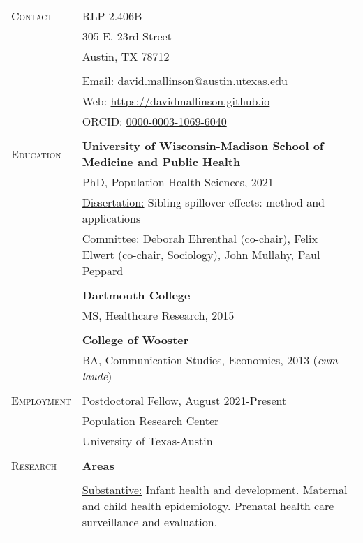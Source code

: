 \documentclass[letterpaper,10pt,oneside]{article}
\begin{document}
\begin{longtable}{@{} p{} p{}}
\textsc{Contact}   & RLP 2.406B \\
     & 305 E. 23rd Street \\
     & Austin, TX 78712 \\
     & \\
     & Email: david.mallinson@austin.utexas.edu \\
     & Web: \href{https://davidmallinson.github.io}{https://davidmallinson.github.io} \\
     & ORCID: \href{https://orcid.org/0000-0003-1069-6040/}{0000-0003-1069-6040} \\
     & \\
\textsc{Education}    & \textbf{University of Wisconsin-Madison School of Medicine and Public Health} \\
     & PhD, Population Health Sciences, 2021 \\
     & \parbox{6.15in}{\underline{Dissertation:} Sibling spillover effects: method and applications} \\
     & \parbox{6.15in}{\underline{Committee:} Deborah Ehrenthal (co-chair), Felix Elwert (co-chair, Sociology), John Mullahy, Paul Peppard} \\
     & \\
     & \textbf{Dartmouth College} \\
     & MS, Healthcare Research, 2015 \\
     & \\
     & \textbf{College of Wooster} \\
     & BA, Communication Studies, Economics, 2013 (\textit{cum laude}) \\
     & \\
\textsc{Employment} & Postdoctoral Fellow, August 2021-Present \\
     & Population Research Center \\
     & University of Texas-Austin \\
     & \\
\textsc{Research}   &\textbf{Areas} \\
    & \\
    & \parbox{6.15in}{\underline{Substantive:} Infant health and development. Maternal and child health epidemiology. Prenatal health care surveillance and evaluation.} \\
    & \\

\end{longtable}
\end{document}
